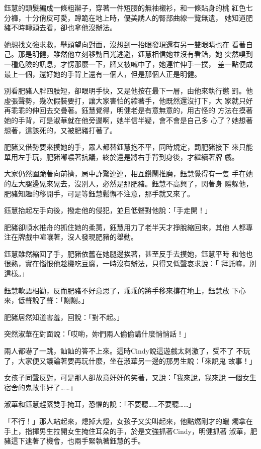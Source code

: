鈺慧的頭髮編成一條粗辮子，穿著一件短腰的無袖襯衫，和一條貼身的桃
紅色七分褲，十分俏皮可愛，蹲跪在地上時，優美誘人的臀部曲線一覽無遺，
她知道肥豬不時轉頭去看，卻也拿他沒辦法。

她想找文強求救，舉頭望向對面，沒想到一抬眼發現還有另一雙眼睛也在
看著自己。那是明健，雖然他立刻移動目光逃避，鈺慧相信她並沒有看錯，她
突然嗅到一種危險的訊息，才愣那麼一下，牌又被喊中了，她連忙伸手一撲，
差一點便成最上一個，還好她的手背上還有一個人，但是那個人正是明健。

別看肥豬人胖四肢短，卻眼明手快，又是他按在最下一層，由他來執行懲
罰。他虛張聲勢，幾次假裝要打，讓大家害怕的縮著手，他既然還沒打下，大
家就只好再乖乖的伸回去交疊著。鈺慧覺得，明健老是有意無意的，用古怪的
方法在摸著她的手背，可是淑華就在他旁邊啊，她半信半疑，會不會是自己多
心了？她想著想著，這該死的，又被肥豬打著了。

肥豬又借勢要來摸她的手，眾人都替鈺慧抱不平，同時規定，罰肥豬接下
來只能單用左手玩，肥豬嘟噥著抗議，終於還是將右手背到身後，才繼續著牌
戲。

大家仍然圍跪著向前擠，局中詐驚連連，相互鑽鬧推磨，鈺慧覺得有一隻
手在她的左大腿邊晃來晃去，沒別人，必然是那肥豬。鈺慧不高興了，閃著身
體躲他，肥豬知趣的移開手，可是等鈺慧鬆懈不注意，那手就又來了。

鈺慧抬起左手向後，撥走他的侵犯，並且低聲對他說：「手走開！」

肥豬卻順水推舟的抓住她的柔荑，鈺慧用力了老半天才掙脫縮回來，其他
人都專注在牌戲中喧嚷著，沒人發現肥豬的舉動。

鈺慧雖然縮回了手，肥豬依舊在她腿邊挨著，甚至反手去摸她，鈺慧平時
和他也很熟，實在惱恨他趁機吃豆腐，一時沒有辦法，只得又低聲哀求說：「
拜託嘛，別這樣。」

鈺慧軟語相勸，反而肥豬不好意思了，乖乖的將手移來撐在地上，鈺慧放
下心來，低聲說了聲：「謝謝。」

肥豬居然知道害羞，回說：「對不起。」

突然淑華在對面說：「哎喲，妳們兩人偷偷講什麼悄悄話！」

兩人都嚇了一跳，訕訕的答不上來。這時Cindy說這遊戲太刺激了，受不了
不玩了，大家便又議論著要再玩什麼，坐在淑華另一邊的那男生說：「來說鬼
故事！」

女孩子同聲反對，可是那人卻故意奸奸的笑著，又說：「我來說，我來說
一個女生宿舍的鬼故事好了……」

淑華和鈺慧趕緊雙手掩耳，恐懼的說：「不要聽……不要聽……」

「不行！」那人站起來，熄掉大燈，女孩子又尖叫起來，他點燃剛才的蠟
燭拿在手上，指揮男生拉開女生掩住耳朵的手，於是文強抓著Cindy，明健抓著
淑華，肥豬這下逮著了機會，也兩手緊執著鈺慧的手。

